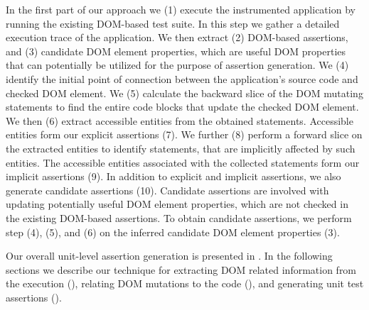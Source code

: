 In the first part of our approach we (1) execute the instrumented application by running the existing DOM-based test suite. In this step we gather a detailed execution trace of the application. We then extract (2) DOM-based assertions, and (3) candidate DOM element properties, which are useful DOM properties that can potentially be utilized for the purpose of assertion generation. We (4) identify the initial point of connection between the application's source code and checked DOM element. 
We (5) calculate the backward slice of the DOM mutating statements to find the entire code blocks that update the checked DOM element. We then (6) extract accessible entities from the obtained statements. Accessible entities form our explicit assertions (7). We further (8) perform a forward slice on the extracted entities to identify statements, that are implicitly affected by such entities. The accessible entities associated with the collected statements form our implicit assertions (9). In addition to explicit and implicit assertions, we also generate candidate assertions (10). Candidate assertions are involved with updating potentially useful DOM element properties, which are not checked in the existing DOM-based assertions. To obtain candidate assertions, we perform step (4), (5), and (6) on the inferred candidate DOM element properties (3).

Our overall unit-level assertion generation is presented in . In the following sections we describe our technique for extracting DOM related information from the execution (), relating
DOM mutations to the \javascript code (), and generating unit test assertions ().   


         
